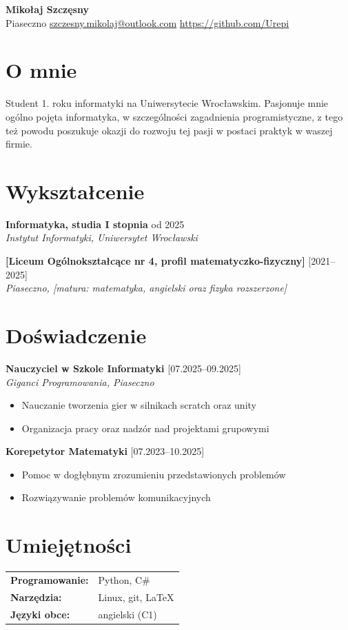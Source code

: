\documentclass{article}
\begin{document}
\begin{center}
  {\LARGE \textbf{Mikołaj Szczęsny}}\\[2mm]
  Piaseczno \quad [+48 508 954 226] \quad \url{szczesny.mikolaj@outlook.com} \quad \url{https://github.com/Urepi}
\end{center}

\section*{O mnie}
Student 1. roku informatyki na Uniwersytecie Wrocławskim.
Pasjonuje mnie ogólno pojęta informatyka, w szczególności zagadnienia programistyczne, z tego też powodu poszukuje okazji do rozwoju tej pasji w postaci praktyk w waszej firmie.

\section*{Wykształcenie}
\textbf{Informatyka, studia I stopnia} \hfill od 2025\\
\emph{Instytut Informatyki, Uniwersytet Wrocławski}

\medskip
\textbf{[Liceum Ogólnokształcące nr 4, profil matematyczko-fizyczny]} \hfill [2021--2025]\\
\emph{Piaseczno, [matura: matematyka, angielski oraz fizyka rozszerzone]}

\section*{Doświadczenie}
\textbf{Nauczyciel w Szkole Informatyki} \hfill [07.2025--09.2025]\\
\emph{Giganci Programowania, Piaseczno}
\begin{itemize}
  \item {Nauczanie tworzenia gier w silnikach scratch oraz unity}
  \item {Organizacja pracy oraz nadzór nad projektami grupowymi}
\end{itemize}
\textbf{Korepetytor Matematyki} \hfill [07.2023--10.2025]\\

\begin{itemize}
  \item {Pomoc w dogłębnym zrozumieniu przedstawionych problemów}
  \item {Rozwiązywanie problemów komunikacyjnych}
\end{itemize}

\section*{Umiejętności}
\begin{tabular}{ll}
  \textbf{Programowanie:} & Python, C\# \\
  \textbf{Narzędzia:}     & Linux, git, \LaTeX \\
  \textbf{Języki obce:}   & angielski (C1) \\
\end{tabular}
\end{document}
